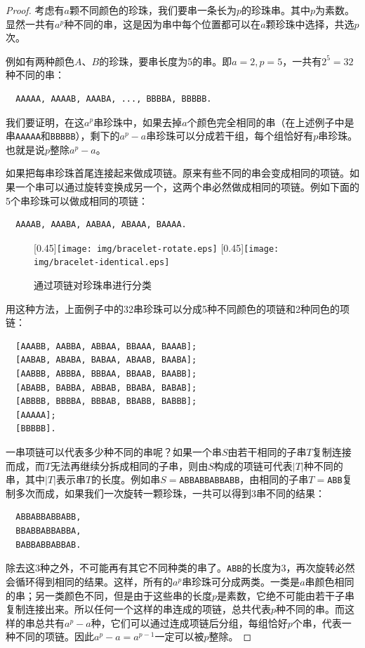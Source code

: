 \documentclass{article}
\begin{document}
\begin{proof}
考虑有$a$颗不同颜色的珍珠，我们要串一条长为$p$的珍珠串。其中$p$为素数。显然一共有$a^p$种不同的串，这是因为串中每个位置都可以在$a$颗珍珠中选择，共选$p$次。

例如有两种颜色$A$、$B$的珍珠，要串长度为5的串。即$a = 2, p = 5$，一共有$2^5 = 32$种不同的串：

\begin{verbatim}
  AAAAA, AAAAB, AAABA, ..., BBBBA, BBBBB.
\end{verbatim}

我们要证明，在这$a^p$串珍珠中，如果去掉$a$个颜色完全相同的串（在上述例子中是串\texttt{AAAAA}和\texttt{BBBBB}），剩下的$a^p - a$串珍珠可以分成若干组，每个组恰好有$p$串珍珠。也就是说$p$整除$a^p - a$。

如果把每串珍珠首尾连接起来做成项链。原来有些不同的串会变成相同的项链。如果一个串可以通过旋转变换成另一个，这两个串必然做成相同的项链。例如下面的5个串珍珠可以做成相同的项链：

\begin{verbatim}
  AAAAB, AAABA, AABAA, ABAAA, BAAAA.
\end{verbatim}

\begin{figure}[htbp]
  \centering
  [0.45\linewidth]{\texttt{[image: img/bracelet-rotate.eps]}} \quad
  [0.45\linewidth]{\texttt{[image: img/bracelet-identical.eps]}}
  \caption{通过项链对珍珠串进行分类}
  \label{fig:bracelet}
\end{figure}

用这种方法，上面例子中的32串珍珠可以分成5种不同颜色的项链和2种同色的项链：

\begin{verbatim}
  [AAABB, AABBA, ABBAA, BBAAA, BAAAB];
  [AABAB, ABABA, BABAA, ABAAB, BAABA];
  [AABBB, ABBBA, BBBAA, BBAAB, BAABB];
  [ABABB, BABBA, ABBAB, BBABA, BABAB];
  [ABBBB, BBBBA, BBBAB, BBABB, BABBB];
  [AAAAA];
  [BBBBB].
\end{verbatim}

一串项链可以代表多少种不同的串呢？如果一个串$S$由若干相同的子串$T$复制连接而成，而$T$无法再继续分拆成相同的子串，则由$S$构成的项链可代表$|T|$种不同的串，其中$|T|$表示串$T$的长度。例如串$S=$\texttt{ABBABBABBABB}，由相同的子串$T=$\texttt{ABB}复制多次而成，如果我们一次旋转一颗珍珠，一共可以得到3串不同的结果：

\begin{verbatim}
  ABBABBABBABB,
  BBABBABBABBA,
  BABBABBABBAB.
\end{verbatim}

除去这3种之外，不可能再有其它不同种类的串了。\texttt{ABB}的长度为3，再次旋转必然会循环得到相同的结果。这样，所有的$a^p$串珍珠可分成两类。一类是$a$串颜色相同的串；另一类颜色不同，但是由于这些串的长度$p$是素数，它绝不可能由若干子串复制连接出来。所以任何一个这样的串连成的项链，总共代表$p$种不同的串。而这样的串总共有$a^p - a$种，它们可以通过连成项链后分组，每组恰好$p$个串，代表一种不同的项链。因此$a^p-a = a^{p-1}$一定可以被$p$整除。
\end{proof}
\end{document}
